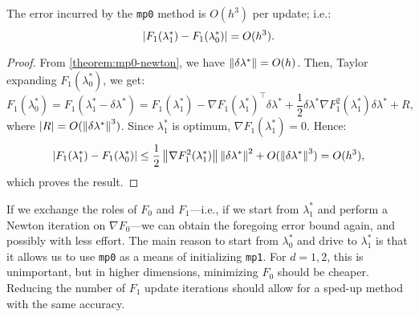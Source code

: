 \documentclass[eikonal.tex]{subfiles}
\begin{document}
\begin{corollary}
  The error incurred by the \texttt{mp0} method is $O(h^3)$ per
  update; i.e.:
  \begin{equation}
    \label{eq:mp0-error}
    \left|F_1(\lambda_1^*) - F_1(\lambda_0^*)\right| = O(h^3).
  \end{equation}
\end{corollary}

\begin{proof}
  From \cref{theorem:mp0-newton}, we have
  $\left\|\delta\lambda^*\right\| = O(h)$. Then, Taylor expanding
  $F_1(\lambda_0^*)$, we get:
  \begin{equation*}
    F_1(\lambda_0^*)
    = F_1(\lambda_1^* - \delta \lambda^*) = F_1(\lambda_1^*) - \nabla F_1(\lambda_1^*)^\top \delta\lambda^* + \frac{1}{2} \delta\lambda^* \nabla F_1^2(\lambda_1^*) \delta\lambda^* + R,
  \end{equation*}
  where $\left|R\right| = O(\left\|\delta\lambda^*\right\|^3)$. Since $\lambda_1^*$
  is optimum, $\nabla F_1(\lambda_1^*) = 0$. Hence:
  \begin{equation*}
    \left|F_1(\lambda_1^*) - F_1(\lambda_0^*)\right| \leq \frac{1}{2} \left\|\nabla F_1^2(\lambda_1^*)\right\| \left\|\delta\lambda^*\right\|^2 + O(\left\|\delta\lambda^*\right\|^3) = O(h^3),
  \end{equation*}
  which proves the result.
\end{proof}

\begin{remark}
  If we exchange the roles of $F_0$ and $F_1$---i.e., if we start from
  $\lambda_1^*$ and perform a Newton iteration on $\nabla F_0$---we
  can obtain the foregoing error bound again, and possibly with less
  effort. The main reason to start from $\lambda_0^*$ and drive to
  $\lambda_1^*$ is that it allows us to use \texttt{mp0} as a means
  of initializing \texttt{mp1}. For $d = 1, 2$, this is unimportant,
  but in higher dimensions, minimizing $F_0$ should be
  cheaper. Reducing the number of $F_1$ update iterations should allow
  for a sped-up method with the same accuracy.
\end{remark}
\end{document}

